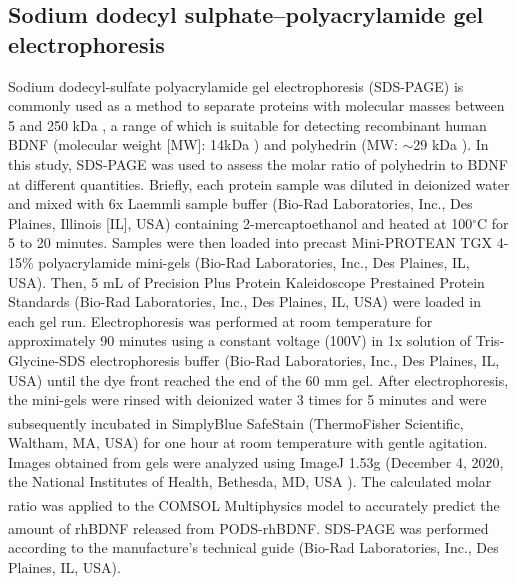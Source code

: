 \documentclass[review]{elsarticle}
\begin{document}
\subsection{Sodium dodecyl sulphate–polyacrylamide gel electrophoresis} 
Sodium dodecyl-sulfate polyacrylamide gel electrophoresis (SDS-PAGE) is commonly used as a method to separate proteins with molecular masses between 5 and 250 kDa  \cite{Laemmli1970}, a range of which is suitable for detecting recombinant human BDNF (molecular weight [MW]: 14kDa \cite {Mandel2009}) and polyhedrin (MW: $\sim$29 kDa \cite{Guo2017}). In this study, SDS-PAGE was used to assess the molar ratio of polyhedrin to BDNF at different quantities.  Briefly, each protein sample was diluted in deionized water and mixed with 6x Laemmli sample buffer (Bio-Rad Laboratories, Inc., Des Plaines, Illinois [IL], USA) containing 2-mercaptoethanol and heated at 100$^\circ$C for 5 to 20 minutes. Samples were then loaded into precast Mini-PROTEAN TGX 4-15\% polyacrylamide mini-gels (Bio-Rad Laboratories, Inc., Des Plaines, IL, USA). Then, 5 mL of Precision Plus Protein Kaleidoscope Prestained Protein Standards (Bio-Rad Laboratories, Inc., Des Plaines, IL, USA) were loaded in each gel run. Electrophoresis was performed at room temperature for approximately 90 minutes using a constant voltage (100V) in 1x solution of Tris-Glycine-SDS electrophoresis buffer (Bio-Rad Laboratories, Inc., Des Plaines, IL, USA) until the dye front reached the end of the 60 mm gel. After electrophoresis, the mini-gels were rinsed with deionized water 3 times for 5 minutes and were subsequently incubated in SimplyBlue\textsuperscript{\texttrademark} SafeStain (ThermoFisher Scientific, Waltham, MA, USA) for one hour at room temperature with gentle agitation. Images obtained from gels were analyzed using ImageJ 1.53g (December 4, 2020, the National Institutes of Health, Bethesda, MD, USA \cite{Schneider2012}). The calculated molar ratio was applied to the COMSOL\textsuperscript{\textregistered} Multiphysics model to accurately predict the amount of rhBDNF released from PODS\textsuperscript{\textregistered}-rhBDNF. SDS-PAGE was performed according to the manufacture's technical guide (Bio-Rad Laboratories, Inc., Des Plaines, IL, USA). 
\end{document}
